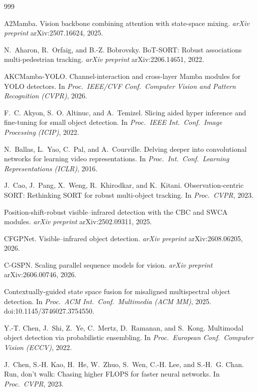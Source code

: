 \begin{thebibliography}{999}

A2Mamba. Vision backbone combining attention with state-space mixing.
\textit{arXiv preprint} arXiv:2507.16624, 2025.

N.~Aharon, R.~Orfaig, and B.-Z. Bobrovsky.
BoT-SORT: Robust associations multi-pedestrian tracking.
\textit{arXiv preprint} arXiv:2206.14651, 2022.

AKCMamba-YOLO. Channel-interaction and cross-layer Mamba modules for YOLO
detectors. In \textit{Proc.\ IEEE/CVF Conf.\ Computer Vision and Pattern
Recognition (CVPR)}, 2026.

F.~C. Akyon, S.~O. Altinuc, and A.~Temizel.
Slicing aided hyper inference and fine-tuning for small object detection.
In \textit{Proc.\ IEEE Int.\ Conf.\ Image Processing (ICIP)}, 2022.

N.~Ballas, L.~Yao, C.~Pal, and A.~Courville.
Delving deeper into convolutional networks for learning video representations.
In \textit{Proc.\ Int.\ Conf.\ Learning Representations (ICLR)}, 2016.

J.~Cao, J.~Pang, X.~Weng, R.~Khirodkar, and K.~Kitani.
Observation-centric SORT: Rethinking SORT for robust multi-object tracking.
In \textit{Proc.\ CVPR}, 2023.

Position-shift-robust visible--infrared detection with the CBC and SWCA
modules. \textit{arXiv preprint} arXiv:2502.09311, 2025.

CFGPNet. Visible--infrared object detection.
\textit{arXiv preprint} arXiv:2608.06205, 2026.

C-GSPN. Scaling parallel sequence models for vision.
\textit{arXiv preprint} arXiv:2606.00746, 2026.

Contextually-guided state space fusion for misaligned multispectral object
detection. In \textit{Proc.\ ACM Int.\ Conf.\ Multimedia (ACM MM)}, 2025.
doi:10.1145/3746027.3754550.

Y.-T. Chen, J.~Shi, Z.~Ye, C.~Mertz, D.~Ramanan, and S.~Kong.
Multimodal object detection via probabilistic ensembling.
In \textit{Proc.\ European Conf.\ Computer Vision (ECCV)}, 2022.

J.~Chen, S.-H. Kao, H.~He, W.~Zhuo, S.~Wen, C.-H. Lee, and S.-H.~G. Chan.
Run, don't walk: Chasing higher FLOPS for faster neural networks.
In \textit{Proc.\ CVPR}, 2023.


\end{thebibliography}
